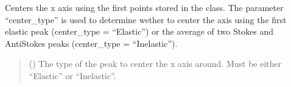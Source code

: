 \documentclass[letterpaper,10pt,english]{sphinxmanual}
\begin{document}
\begin{fulllineitems}
\begin{fulllineitems}
\begin{quote}
\begin{description}
\end{description}\end{quote}

\end{fulllineitems}


\begin{fulllineitems}
\label{\detokenize{source/_autosummary/HDF5_BLS_analyse.Analyse_VIPA:HDF5_BLS_analyse.Analyse_VIPA.center_x_axis}}
\pysigstartsignatures
\pysiglinewithargsret
{}
{}
{}
\pysigstopsignatures
\sphinxAtStartPar
Centers the x axis using the first points stored in the class. The parameter “center\_type” is used to determine wether to center the axis using the first elastic peak (center\_type = “Elastic”) or the average of two Stokes and Anti\sphinxhyphen{}Stokes peaks (center\_type = “Inelastic”).
\begin{quote}\begin{description}
\sphinxAtStartPar
{} () \textendash{} The type of the peak to center the x axis around. Must be either “Elastic” or “Inelastic”.

\end{description}\end{quote}

\end{fulllineitems}



\end{fulllineitems}
\end{document}
